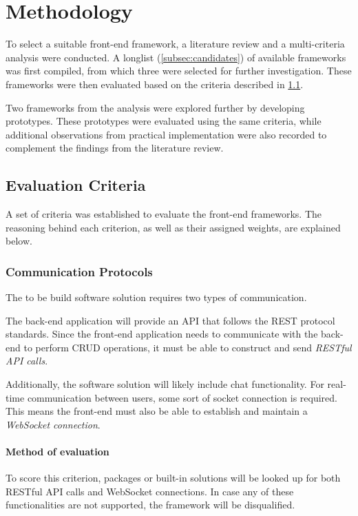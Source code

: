 \section{Methodology}
To select a suitable front-end framework, a literature review and a multi-criteria analysis were conducted.
A longlist (\cref{subsec:candidates}) of available frameworks was first compiled, from which three were selected for further investigation.
These frameworks were then evaluated based on the criteria described in \cref{subsec:criteria}.

Two frameworks from the analysis were explored further by developing prototypes.
These prototypes were evaluated using the same criteria, while additional observations from practical implementation were also recorded to complement the findings from the literature review.

\subsection{Evaluation Criteria}\label{subsec:criteria}
A set of criteria was established to evaluate the front-end frameworks.
The reasoning behind each criterion, as well as their assigned weights, are explained below.

\subsubsection{Communication Protocols}\label{subsubsec:communication-protocols}
The to be build software solution requires two types of communication.

The back-end application will provide an API that follows the REST protocol standards.
Since the front-end application needs to communicate with the back-end to perform CRUD operations, it must be able to construct and send \emph{RESTful API calls}.

Additionally, the software solution will likely include chat functionality.
For real-time communication between users, some sort of socket connection is required.
This means the front-end must also be able to establish and maintain a \emph{WebSocket connection}.

\paragraph{Method of evaluation}
To score this criterion, packages or built-in solutions will be looked up for both RESTful API calls and WebSocket connections.
In case any of these functionalities are not supported, the framework will be disqualified.

